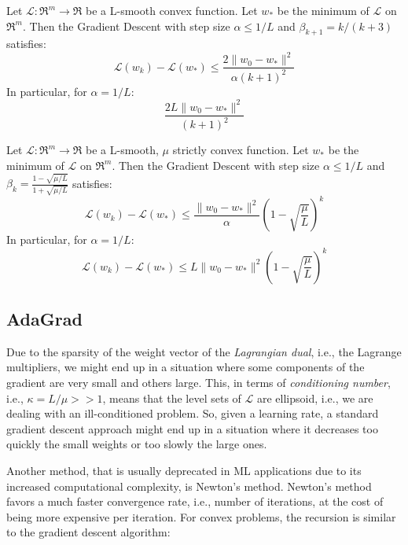 \begin{theorem} \label{thm:cvx_nag_convergence}
Let $\mathcal{L}: \Re^m \rightarrow \Re$ be a L-smooth convex function. Let $w_*$ be the minimum of $\mathcal{L}$ on $\Re^m$. Then the Gradient Descent with step size $\alpha \leq 1/L$ and $\beta_{k+1} = k / (k+3)$ satisfies:
$$
\mathcal{L}(w_k) - \mathcal{L}(w_*) \leq \frac{2 \| w_0 - w_* \|^2}{\alpha (k+1)^2}
$$
In particular, for $\alpha = 1/L$:
$$
\frac{2L \| w_0 - w_* \|^2}{(k+1)^2}
$$
\end{theorem}

\begin{theorem} \label{thm:strong_cvx_nag_convergence}
Let $\mathcal{L}: \Re^m \rightarrow \Re$ be a L-smooth, $\mu$ strictly convex function. Let $w_*$ be the minimum of $\mathcal{L}$ on $\Re^m$. Then the Gradient Descent with step size $\alpha \leq 1/L$ and $\beta_k = \displaystyle \frac{1 - \sqrt{\mu / L}}{1 + \sqrt{\mu / L}}$ satisfies:
$$
\mathcal{L}(w_k) - \mathcal{L}(w_*) \leq \frac{\| w_0 - w_* \|^2}{\alpha} (1 - \sqrt{\frac{\mu}{L}})^k
$$
In particular, for $\alpha = 1/L$:
$$
\mathcal{L}(w_k) - \mathcal{L}(w_*) \leq L \| w_0 - w_* \|^2 (1 - \sqrt{\frac{\mu}{L}})^k
$$
\end{theorem}

\pagebreak

\subsection{AdaGrad}

Due to the sparsity of the weight vector of the \emph{Lagrangian dual}, i.e., the Lagrange multipliers, we might end up in a situation where some components of the gradient are very small and others large. This, in terms of \emph{conditioning number}, i.e., $\kappa = L/\mu >> 1$, means that the level sets of $\mathcal{L}$ are ellipsoid, i.e., we are dealing with an ill-conditioned problem. So, given a learning rate, a standard gradient descent approach might end up in a situation where it decreases too quickly the small weights or too slowly the large ones.

Another method, that is usually deprecated in ML applications due to its increased computational complexity, is Newton’s method. Newton’s method favors a much faster convergence rate, i.e., number of iterations, at the cost of being more expensive per iteration. For convex problems, the recursion is similar to the gradient descent algorithm:

